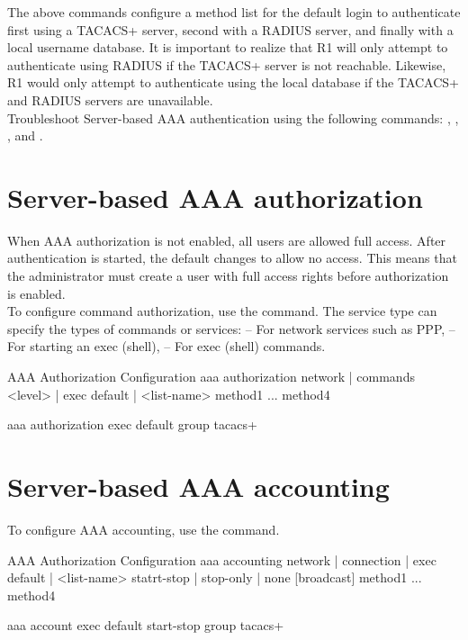The above commands configure a method list for the default login to authenticate first using a TACACS+ server, second with a RADIUS server, and finally with a local username database. It is important to realize that R1 will only attempt to authenticate using RADIUS if the TACACS+ server is not reachable. Likewise, R1 would only attempt to authenticate using the local database if the TACACS+ and RADIUS servers are unavailable.\\

Troubleshoot Server-based AAA authentication using the following commands: , , , and .

\section{Server-based AAA authorization}

When AAA authorization is not enabled, all users are allowed full access. After authentication is started, the default changes to allow no access. This means that the administrator must create a user with full access rights before authorization is enabled. \\

To configure command authorization, use the  command. The service type can specify the types of commands or services:
 -- For network services such as PPP,  -- For starting an exec (shell),  -- For exec (shell) commands. 

\begin{sexylisting}{AAA Authorization Configuration}
aaa authorization {network | commands <level> | exec} {default | <list-name>} 
  method1 ... method4
  
aaa authorization exec default group tacacs+
\end{sexylisting}

\section{Server-based AAA accounting}

To configure AAA accounting, use the  command. 

\begin{sexylisting}{AAA Authorization Configuration}
aaa accounting {network | connection | exec} {default | <list-name>} 
         {statrt-stop | stop-only | none} [broadcast] method1 ... method4

aaa account exec default start-stop group tacacs+
\end{sexylisting}

